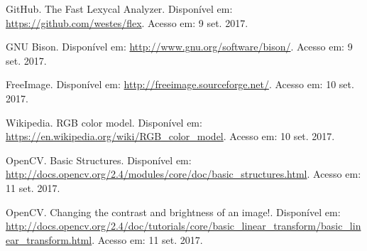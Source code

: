 \documentclass[a4paper, 10pt, conference]{ieeeconf}
\begin{document}
\begin{thebibliography}{99}

 GitHub. The Fast Lexycal Analyzer. Disponível em: \url{https://github.com/westes/flex}. Acesso em: 9 set. 2017. 

 GNU Bison. Disponível em: \url{http://www.gnu.org/software/bison/}. Acesso em: 9 set. 2017.

 FreeImage. Disponível em: \url{http://freeimage.sourceforge.net/}. Acesso em: 10 set. 2017.

 Wikipedia. RGB color model. Disponível em: \url{https://en.wikipedia.org/wiki/RGB_color_model}. Acesso em: 10 set. 2017.

 OpenCV. Basic Structures. Disponível em: \url{http://docs.opencv.org/2.4/modules/core/doc/basic_structures.html}. Acesso em: 11 set. 2017.

 OpenCV. Changing the contrast and brightness of an image!. Disponível em: \url{http://docs.opencv.org/2.4/doc/tutorials/core/basic_linear_transform/basic_linear_transform.html}. Acesso em: 11 set. 2017.

\end{thebibliography}
\end{document}
